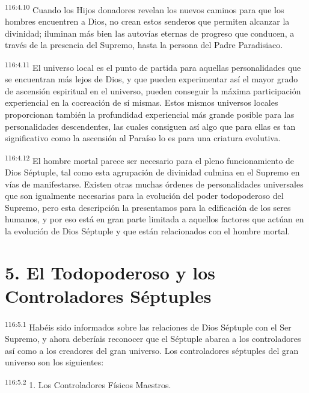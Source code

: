 \documentclass[twoside, 11pt]{book}
\begin{document}
\par
\textsuperscript{116:4.10} Cuando los Hijos donadores revelan los nuevos caminos para que los hombres encuentren a Dios, no crean estos senderos que permiten alcanzar la divinidad; iluminan más bien las autovías eternas de progreso que conducen, a través de la presencia del Supremo, hasta la persona del Padre Paradisiaco.

\par
\textsuperscript{116:4.11} El universo local es el punto de partida para aquellas personalidades que se encuentran más lejos de Dios, y que pueden experimentar así el mayor grado de ascensión espiritual en el universo, pueden conseguir la máxima participación experiencial en la cocreación de sí mismas. Estos mismos universos locales proporcionan también la profundidad experiencial más grande posible para las personalidades descendentes, las cuales consiguen así algo que para ellas es tan significativo como la ascensión al Paraíso lo es para una criatura evolutiva.

\par
\textsuperscript{116:4.12} El hombre mortal parece ser necesario para el pleno funcionamiento de Dios Séptuple, tal como esta agrupación de divinidad culmina en el Supremo en vías de manifestarse. Existen otras muchas órdenes de personalidades universales que son igualmente necesarias para la evolución del poder todopoderoso del Supremo, pero esta descripción la presentamos para la edificación de los seres humanos, y por eso está en gran parte limitada a aquellos factores que actúan en la evolución de Dios Séptuple y que están relacionados con el hombre mortal.

\section*{5. El Todopoderoso y los Controladores Séptuples}
\par
\textsuperscript{116:5.1} Habéis sido informados sobre las relaciones de Dios Séptuple con el Ser Supremo, y ahora deberíais reconocer que el Séptuple abarca a los controladores así como a los creadores del gran universo. Los controladores séptuples del gran universo son los siguientes:

\par
\textsuperscript{116:5.2} 1. Los Controladores Físicos Maestros.
\end{document}
